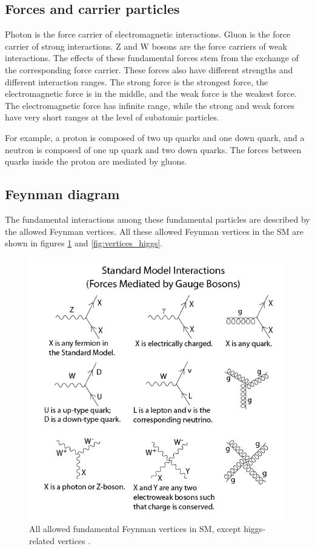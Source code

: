 \subsection{Forces and carrier particles}
Photon is the force carrier of electromagnetic interactions.
Gluon is the force carrier of strong interactions.
Z and W bosons are the force carriers of weak interactions.
The effects of these fundamental forces stem from the exchange of the corresponding force carrier.
These forces also have different strengths and different interaction ranges.
The strong force is the strongest force, the electromagnetic force is in the middle, and the weak force is the weakest force.
The electromagnetic force has infinite range, while the strong and weak forces have very short ranges at the level of subatomic particles.

For example, a proton is composed of two up quarks and one down quark, and a neutron is composed of one up quark and two down quarks.
The forces between quarks inside the proton are mediated by gluons.

\subsection{Feynman diagram}
The fundamental interactions among these fundamental particles are described by the allowed Feynman vertices.
All these allowed Feynman vertices in the SM are shown in figures \ref{fig:vertices_SM} and \ref{fig:vertices_higgs}.

\begin{figure}
\centering
\includegraphics[width=\textwidth]{data/photo/theory/vertices_SM.png}
\caption{All allowed fundamental Feynman vertices in SM, except higgs-related vertices \cite{vertices_SM}.}
\label{fig:vertices_SM}
\end{figure}

